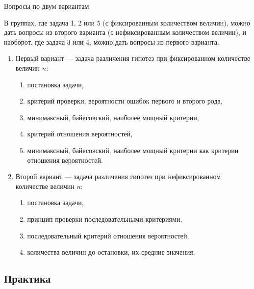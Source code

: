 \documentclass[a4paper,12pt]{article}
\begin{document}
Вопросы по двум вариантам.

В группах, где задача 1, 2 или 5 (с фиксированным количеством величин), можно дать вопросы из второго варианта (с нефиксированным количеством величин),
и наоборот, где задача 3 или 4, можно дать вопросы из первого варианта.

\begin{enumerate}
      \item Первый вариант --- задача различения гипотез при фиксированном количестве величин $n$:
            \begin{enumerate}
                  \item постановка задачи,
                  \item критерий проверки, вероятности ошибок первого и второго рода,
                  \item минимаксный, байесовский, наиболее мощный критерии,
                  \item критерий отношения вероятностей,
                  \item минимаксный, байесовский, наиболее мощный критерии как критерии отношения вероятностей.
            \end{enumerate}
      \item Второй вариант --- задача различения гипотез при нефиксированном количестве величин $n$:
            \begin{enumerate}
                  \item постановка задачи,
                  \item принцип проверки последовательными критериями,
                  \item последовательный критерий отношения вероятностей,
                  \item количества величин до остановки, их средние значения.
            \end{enumerate}
\end{enumerate}

\subsection*{Практика}
\end{document}
